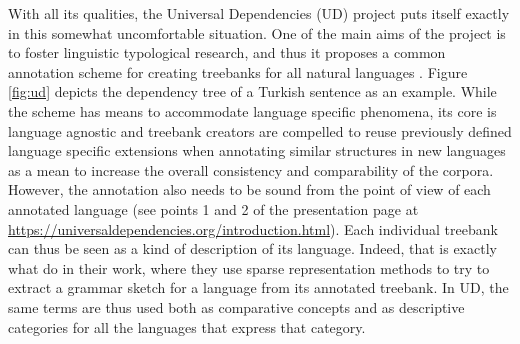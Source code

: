 \documentclass[11pt]{article}
\begin{document}
With all its qualities, the Universal Dependencies (UD) project \cite{UD214} puts itself exactly in this somewhat uncomfortable situation.
One of the main aims of the project is to foster linguistic typological research, and thus it proposes a common annotation scheme for creating treebanks for all natural languages \cite{UDv2}.
Figure \ref{fig:ud} depicts the dependency tree of a Turkish sentence as an example.
While the scheme has means to accommodate language specific phenomena, its core is language agnostic and treebank creators are compelled to reuse previously defined language specific extensions when annotating similar structures in new languages as a mean to increase the overall consistency and comparability of the corpora.
However, the annotation also needs to be sound from the point of view of each annotated language (see points 1 and 2 of the presentation page at \url{https://universaldependencies.org/introduction.html}).
Each individual treebank can thus be seen as a kind of description of its language.
Indeed, that is exactly what  do in their work, where they use sparse representation methods to try to extract a grammar sketch for a language from its annotated treebank. 
In UD, the same terms are thus used both as comparative concepts and as descriptive categories for all the languages that express that category.
\end{document}
